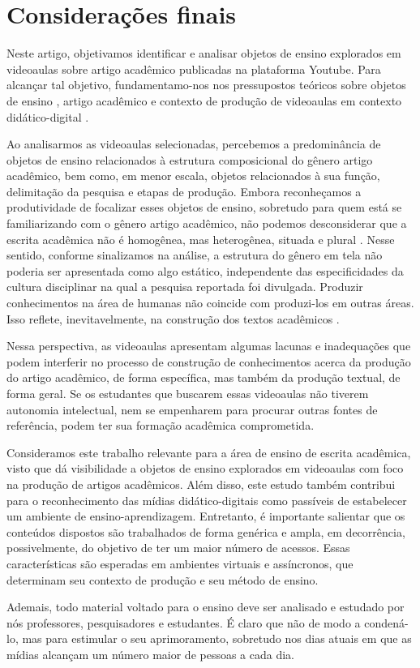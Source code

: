 
\section{Considerações finais} \label{sec-considerações}

Neste artigo, objetivamos identificar e analisar objetos de ensino
explorados em videoaulas sobre artigo acadêmico publicadas na plataforma
Youtube. Para alcançar tal objetivo, fundamentamo-nos nos pressupostos
teóricos sobre objetos de ensino \cite{linodearaujo2014}, artigo
acadêmico \cite{motta-roth2010} e contexto de produção de
videoaulas em contexto didático-digital \cite{laurentino2023}.

Ao analisarmos as videoaulas selecionadas, percebemos a predominância de
objetos de ensino relacionados à estrutura composicional do gênero
artigo acadêmico, bem como, em menor escala, objetos relacionados à sua
função, delimitação da pesquisa e etapas de produção. Embora
reconheçamos a produtividade de focalizar esses objetos de ensino,
sobretudo para quem está se familiarizando com o gênero artigo
acadêmico, não podemos desconsiderar que a escrita acadêmica não é
homogênea, mas heterogênea, situada e plural \cite{lea1998}. Nesse
sentido, conforme sinalizamos na análise, a estrutura do gênero em tela
não poderia ser apresentada como algo estático, independente das
especificidades da cultura disciplinar na qual a pesquisa reportada foi
divulgada. Produzir conhecimentos na área de humanas não coincide com
produzi-los em outras áreas. Isso reflete, inevitavelmente, na
construção dos textos acadêmicos \cite{pereira2019}.

Nessa perspectiva, as videoaulas apresentam algumas lacunas e
inadequações que podem interferir no processo de construção de
conhecimentos acerca da produção do artigo acadêmico, de forma
específica, mas também da produção textual, de forma geral. Se os
estudantes que buscarem essas videoaulas não tiverem autonomia
intelectual, nem se empenharem para procurar outras fontes de
referência, podem ter sua formação acadêmica comprometida.

Consideramos este trabalho relevante para a área de ensino de escrita
acadêmica, visto que dá visibilidade a objetos de ensino explorados em
videoaulas com foco na produção de artigos acadêmicos. Além disso, este
estudo também contribui para o reconhecimento das mídias
didático-digitais como passíveis de estabelecer um ambiente de
ensino-aprendizagem. Entretanto, é importante salientar que os conteúdos
dispostos são trabalhados de forma genérica e ampla, em decorrência,
possivelmente, do objetivo de ter um maior número de acessos. Essas
características são esperadas em ambientes virtuais e assíncronos, que
determinam seu contexto de produção e seu método de ensino.

Ademais, todo material voltado para o ensino deve ser analisado e
estudado por nós professores, pesquisadores e estudantes. É claro que
não de modo a condená-lo, mas para estimular o seu aprimoramento,
sobretudo nos dias atuais em que as mídias alcançam um número maior de
pessoas a cada dia.